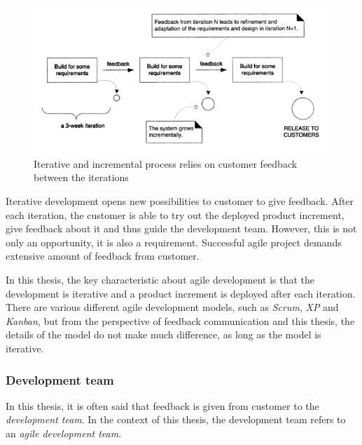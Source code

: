 \documentclass[english,12pt,a4paper,pdftex]{article}
\begin{document}
\begin{figure}[htb]
\begin{center}
\includegraphics[width=1.0\textwidth]{iterative_and_incremental.png}
\end{center}
\caption{Iterative and incremental process relies on customer feedback between the iterations \citep{larman2004}}
\label{fig:iterative_and_incremental}
\end{figure}

Iterative development opens new possibilities to customer to give feedback. After each iteration, the customer is able to try out the deployed product increment, give feedback about it and thus guide the development team. However, this is not only an opportunity, it is also a requirement. Successful agile project demands extensive amount of feedback from customer.

In this thesis, the key characteristic about agile development is that the development is iterative and a product increment is deployed after each iteration. There are various different agile development models, such as \emph{Scrum}, \emph{\acl{XP}} and \emph{Kanban}, but from the perspective of feedback communication and this thesis, the details of the model do not make much difference, as long as the model is iterative.

\subsubsection{Development team}

In this thesis, it is often said that feedback is given from customer to the \emph{development team}. In the context of this thesis, the development team refers to an \emph{agile development team}. 
\end{document}
